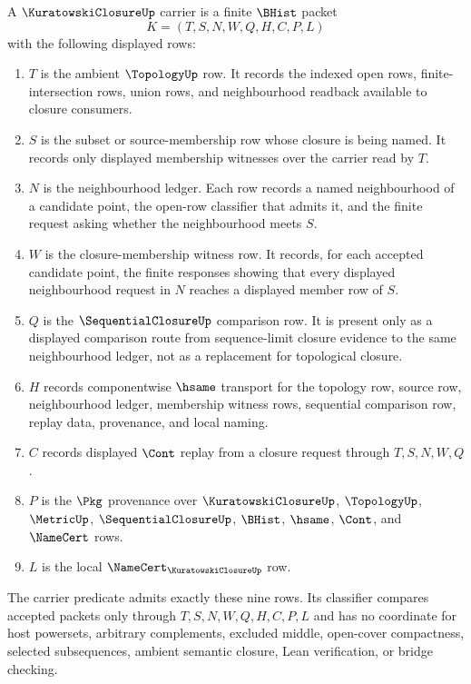 \begin{definition}
\label{def:kuratowski-closure-carrier}
A $\KuratowskiClosureUp$ carrier is a finite $\BHist$ packet
$$
K=(T,S,N,W,Q,H,C,P,L)
$$
with the following displayed rows:
\begin{enumerate}
\item $T$ is the ambient $\TopologyUp$ row. It records the indexed open rows, finite-intersection rows, union rows, and neighbourhood readback available to closure consumers.
\item $S$ is the subset or source-membership row whose closure is being named. It records only displayed membership witnesses over the carrier read by $T$.
\item $N$ is the neighbourhood ledger. Each row records a named neighbourhood of a candidate point, the open-row classifier that admits it, and the finite request asking whether the neighbourhood meets $S$.
\item $W$ is the closure-membership witness row. It records, for each accepted candidate point, the finite responses showing that every displayed neighbourhood request in $N$ reaches a displayed member row of $S$.
\item $Q$ is the $\SequentialClosureUp$ comparison row. It is present only as a displayed comparison route from sequence-limit closure evidence to the same neighbourhood ledger, not as a replacement for topological closure.
\item $H$ records componentwise $\hsame$ transport for the topology row, source row, neighbourhood ledger, membership witness rows, sequential comparison row, replay data, provenance, and local naming.
\item $C$ records displayed $\Cont$ replay from a closure request through $T,S,N,W,Q$.
\item $P$ is the $\Pkg$ provenance over $\KuratowskiClosureUp$, $\TopologyUp$, $\MetricUp$, $\SequentialClosureUp$, $\BHist$, $\hsame$, $\Cont$, and $\NameCert$ rows.
\item $L$ is the local $\NameCert_{\KuratowskiClosureUp}$ row.
\end{enumerate}
The carrier predicate admits exactly these nine rows. Its classifier compares accepted packets only through $T,S,N,W,Q,H,C,P,L$ and has no coordinate for host powersets, arbitrary complements, excluded middle, open-cover compactness, selected subsequences, ambient semantic closure, Lean verification, or bridge checking.
\end{definition}

